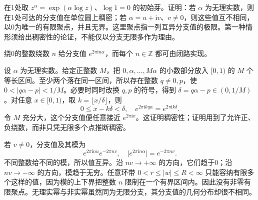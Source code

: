 \begin{exercise}\label{b3:ex:09-3}
在1处取 \(z^\alpha=\exp(\alpha\log z)\)、\(\log1=0\) 的初始芽。证明：若 \(\alpha\) 为无理实数，则在1处可达的分支值在单位圆上稠密；若 \(\alpha=u+\mathrm iv\)、\(v\ne0\)，则这些值互不相同，以0为唯一的有限聚点，并且无界。这里聚点指一列互异分支值的极限。第一种情形须给出稠密性的论证，不能仅以分支无限多作为理由。
\end{exercise}
\begin{solution}
绕0的整数绕数 \(n\) 给分支值 \(e^{2\pi\mathrm i n\alpha}\)，而每个 \(n\in\mathbb Z\) 都可由闭路实现。

设 \(\alpha\) 为无理实数。给定正整数 \(M\)，把 \(0,\alpha,\ldots,M\alpha\) 的小数部分放入 \([0,1)\) 的 \(M\) 个等长区间。至少两个落在同一区间，所以存在整数 \(q\ne0,p\)，使 \(0<|q\alpha-p|<1/M\)。必要时同时改换 \(q,p\) 的符号，得到 \(\delta=q\alpha-p\in(0,1/M)\)。对任意 \(x\in[0,1)\)，取 \(k=\lfloor x/\delta\rfloor\)，则
\[
 0\le x-k\delta<\delta,\quad
 e^{2\pi\mathrm i kq\alpha}=e^{2\pi\mathrm i k\delta}.
\]
令 \(M\) 充分大，这个分支值便任意接近 \(e^{2\pi\mathrm i x}\)。这证明稠密性；证明用到了允许正、负绕数，而非只凭无限多个点推断稠密。

若 \(v\ne0\)，分支值及其模为
\[
 e^{2\pi\mathrm i n u}e^{-2\pi n v},\quad
 \bigl|e^{2\pi\mathrm i n\alpha}\bigr|=e^{-2\pi n v}.
\]
不同整数给不同的模，所以值互异。沿 \(nv\to+\infty\) 的方向，它们趋于0；沿 \(nv\to-\infty\) 的方向，模趋于无穷。任意环带 \(0<r\le|w|\le R<\infty\) 只能容纳有限多个这样的值，因为模的上下界把整数 \(n\) 限制在一个有界区间内。因此没有非零有限聚点。无理实幂与非实幂虽然同为无限分支，其分支值的几何分布却很不相同。
\end{solution}

